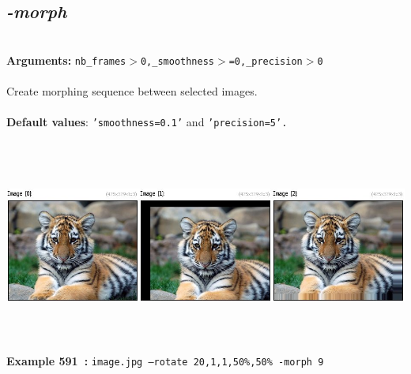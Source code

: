 \documentclass[a4paper,11pt,twoside]{book}
\begin{document}
\subsection{\emph{-morph} }\vspace*{-0.5em}
~\\\textbf{Arguments: } 
{\small \texttt{nb\_frames$>$0,\_smoothness$>$=0,\_precision$>$0}}\\~\\
Create morphing sequence between selected images.
~\\~\\\textbf{Default values}: {\small \texttt{'smoothness=0.1'} and \texttt{'precision=5'.}}
\begin{center}\includegraphics[keepaspectratio=true,height=7cm,width=\textwidth]{img/gmic_def591.jpg}\\
{\footnotesize \textbf{Example 591~:} \texttt{image.jpg --rotate 20,1,1,50\%,50\% -morph 9}}
\end{center}
\end{document}
